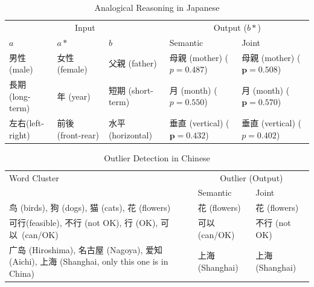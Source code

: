 \begin{table}[h!]
    \centering
    \begin{CJK}{UTF8}{ipxm}
        \begin{tabularx}{\textwidth}{lllbb}
            \toprule
            \multicolumn{3}{c}{Input} & \multicolumn{2}{c}{Output ($b*$)} \\
            \cmidrule(lr){1-3} \cmidrule(lr){4-5} $a$ & $a*$ & $b$ & Semantic & Joint \\\midrule
            \vspace{0.2cm} 男性(male) & 女性 (female) & 父親 (father) & \mbox{母親} (mother) \newline ($p=0.487$) & \mbox{母親} (mother) \newline ($\bm{p=0.508}$) \\
            \vspace{0.2cm} 長期 (long-term) & 年 (year) & 短期 (short-term) & 月 (month) \newline ($p=0.550$) & 月 (month) \newline ($\bm{p=0.570}$) \\
            左右(left-right) & 前後 (front-rear) & 水平 (horizontal) & \mbox{垂直} (\mbox{vertical}) \newline ($\bm{p=0.432}$) & \mbox{垂直} (\mbox{vertical}) \newline ($p=0.402$) \\\bottomrule
        \end{tabularx}
    \end{CJK}
    \caption{Analogical Reasoning in Japanese}
    \label{tab:analysis_analogy2}
\end{table}

\begin{table}[h!]
    \centering
    \begin{CJK}{UTF8}{gbsn}
        \begin{tabularx}{\textwidth}{bll}
            \toprule
            \multirow{2.5}{*}{Word Cluster} & \multicolumn{2}{c}{Outlier (Output)} \\
            \cmidrule(lr){2-3} {} & Semantic & Joint \\\midrule

            鸟 (birds), 狗 (dogs), 猫 (cats), 花 (flowers) & \vspace{0.2cm} 花 (flowers) & 花 (flowers) \\

            可行(feasible), 不行 (not OK), 行 (OK), \mbox{可以}~(can/OK) & \vspace{0.2cm} 可以 (can/OK) & 不行 (not OK) \\

            \mbox{广岛} (Hiroshima), \mbox{名古屋} (Nagoya), \mbox{爱知}(Aichi), 上海 (Shanghai, only this one is in China) & 上海 (Shanghai) & 上海 (Shanghai)\\\bottomrule
        \end{tabularx}
    \end{CJK}
    \caption{Outlier Detection in Chinese}
    \label{tab:analysis_outlier1}
\end{table}

